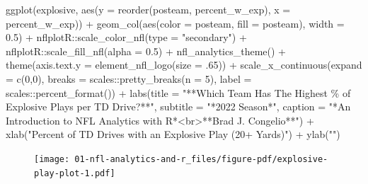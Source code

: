 \documentclass[
  letterpaper,
]{krantz}
\newenvironment{Shaded}{\begin{snugshade}}{\end{snugshade}}
\newcommand{\AttributeTok}[1]{\textcolor[rgb]{0.40,0.45,0.13}{#1}}
\newcommand{\DecValTok}[1]{\textcolor[rgb]{0.68,0.00,0.00}{#1}}
\newcommand{\FloatTok}[1]{\textcolor[rgb]{0.68,0.00,0.00}{#1}}
\newcommand{\FunctionTok}[1]{\textcolor[rgb]{0.28,0.35,0.67}{#1}}
\newcommand{\NormalTok}[1]{\textcolor[rgb]{0.00,0.23,0.31}{#1}}
\newcommand{\SpecialCharTok}[1]{\textcolor[rgb]{0.37,0.37,0.37}{#1}}
\newcommand{\StringTok}[1]{\textcolor[rgb]{0.13,0.47,0.30}{#1}}
\begin{document}
\begin{Shaded}
\begin{Highlighting}[]
\FunctionTok{ggplot}\NormalTok{(explosive, }\FunctionTok{aes}\NormalTok{(}\AttributeTok{y =} \FunctionTok{reorder}\NormalTok{(posteam, percent\_w\_exp),}
                      \AttributeTok{x =}\NormalTok{ percent\_w\_exp)) }\SpecialCharTok{+}
  \FunctionTok{geom\_col}\NormalTok{(}\FunctionTok{aes}\NormalTok{(}\AttributeTok{color =}\NormalTok{ posteam, }\AttributeTok{fill =}\NormalTok{ posteam), }\AttributeTok{width =} \FloatTok{0.5}\NormalTok{) }\SpecialCharTok{+}
\NormalTok{  nflplotR}\SpecialCharTok{::}\FunctionTok{scale\_color\_nfl}\NormalTok{(}\AttributeTok{type =} \StringTok{"secondary"}\NormalTok{) }\SpecialCharTok{+}
\NormalTok{  nflplotR}\SpecialCharTok{::}\FunctionTok{scale\_fill\_nfl}\NormalTok{(}\AttributeTok{alpha =} \FloatTok{0.5}\NormalTok{) }\SpecialCharTok{+}
  \FunctionTok{nfl\_analytics\_theme}\NormalTok{() }\SpecialCharTok{+}
  \FunctionTok{theme}\NormalTok{(}\AttributeTok{axis.text.y =} \FunctionTok{element\_nfl\_logo}\NormalTok{(}\AttributeTok{size =}\NormalTok{ .}\DecValTok{65}\NormalTok{)) }\SpecialCharTok{+}
  \FunctionTok{scale\_x\_continuous}\NormalTok{(}\AttributeTok{expand =} \FunctionTok{c}\NormalTok{(}\DecValTok{0}\NormalTok{,}\DecValTok{0}\NormalTok{),}
                     \AttributeTok{breaks =}\NormalTok{ scales}\SpecialCharTok{::}\FunctionTok{pretty\_breaks}\NormalTok{(}\AttributeTok{n =} \DecValTok{5}\NormalTok{),}
                     \AttributeTok{label =}\NormalTok{ scales}\SpecialCharTok{::}\FunctionTok{percent\_format}\NormalTok{()) }\SpecialCharTok{+}
  \FunctionTok{labs}\NormalTok{(}\AttributeTok{title =} \StringTok{"**Which Team Has The Highest \% of Explosive Plays per TD Drive?**"}\NormalTok{,}
       \AttributeTok{subtitle =} \StringTok{"*2022 Season*"}\NormalTok{,}
       \AttributeTok{caption =} \StringTok{"*An Introduction to NFL Analytics with R*\textless{}br\textgreater{}**Brad J. Congelio**"}\NormalTok{) }\SpecialCharTok{+}
  \FunctionTok{xlab}\NormalTok{(}\StringTok{"Percent of TD Drives with an Explosive Play (20+ Yards)"}\NormalTok{) }\SpecialCharTok{+}
  \FunctionTok{ylab}\NormalTok{(}\StringTok{""}\NormalTok{)}
\end{Highlighting}
\end{Shaded}

\begin{figure}[H]

{\centering \texttt{[image: 01-nfl-analytics-and-r\_files/figure-pdf/explosive-play-plot-1.pdf]}

}

\end{figure}
\end{document}

